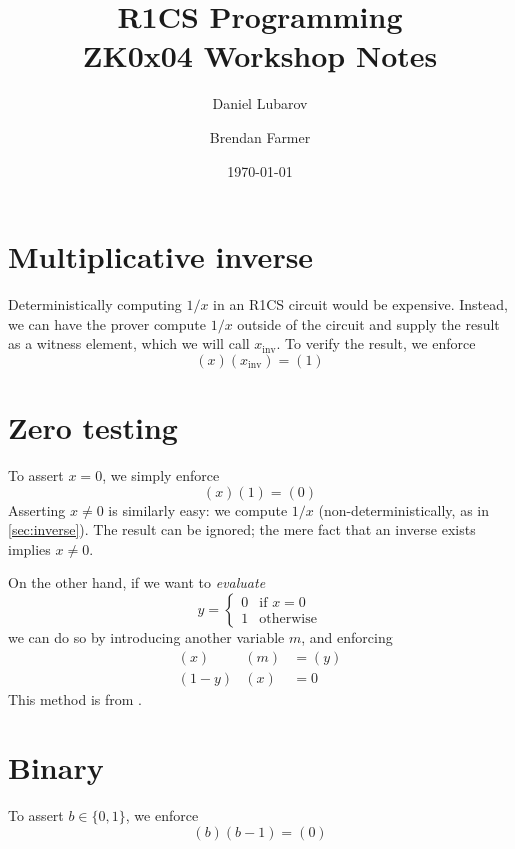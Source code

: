 \documentclass{article}
\title{R1CS Programming \\ \large ZK0x04 Workshop Notes}
\author{Daniel Lubarov \and Brendan Farmer}
\date{\today}
\begin{document}
\maketitle

{\hypersetup{hidelinks} \tableofcontents}
\newpage


\section{Multiplicative inverse} \label{sec:inverse}

Deterministically computing $1 / x$ in an R1CS circuit would be expensive. Instead, we can have the prover compute $1 / x$ outside of the circuit and supply the result as a witness element, which we will call $x_\mathrm{inv}$. To verify the result, we enforce
\begin{equation}
  (x) (x_\mathrm{inv}) = (1)
\end{equation}


\section{Zero testing}

To assert $x = 0$, we simply enforce
\begin{equation}
  (x) (1) = (0)
\end{equation}
Asserting $x \ne 0$ is similarly easy: we compute $1 / x$ (non-deterministically, as in \autoref{sec:inverse}). The result can be ignored; the mere fact that an inverse exists implies $x \ne 0$.

On the other hand, if we want to \textit{evaluate}
\begin{equation}
  y =
  \begin{cases}
    0 & \text{if $x = 0$} \\
    1 & \text{otherwise}
  \end{cases}
\end{equation}
we can do so by introducing another variable $m$, and enforcing
\begin{align}
  (x) & (m) &= (y) \\
  (1 - y) & (x) &= 0
\end{align}
This method is from \cite{parno2013pinocchio}.


\section{Binary}

To assert $b \in \{ 0, 1 \}$, we enforce
\begin{equation}
  (b) (b - 1) = (0)
\end{equation}
\end{document}
